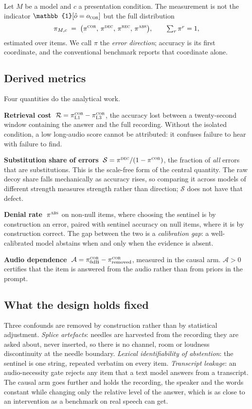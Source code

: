 \documentclass{article}
\begin{document}
Let $M$ be a model and $c$ a presentation condition. The measurement is not
the indicator $\mathbb{1}[\hat{o}=o_{\textsc{cor}}]$ but the full
distribution
\[
  \pi_{M,c} \;=\; \big(\pi^{\textsc{cor}},\,\pi^{\textsc{dec}},\,
  \pi^{\textsc{rec}},\,\pi^{\textsc{abs}}\big),
  \qquad \textstyle\sum_r \pi^r = 1 ,
\]
estimated over items. We call $\pi$ the \emph{error direction}; accuracy is
its first coordinate, and the conventional benchmark reports that coordinate
alone.

\subsection{Derived metrics}
Four quantities do the analytical work.

\noindent\textbf{Retrieval cost} $\;\mathcal{R} =
\pi^{\textsc{cor}}_{\textsc{L1}} - \pi^{\textsc{cor}}_{\textsc{L3}}$, the
accuracy lost between a twenty-second window containing the answer and the
full recording. Without the isolated condition, a low long-audio score cannot
be attributed: it confuses failure to hear with failure to find.

\noindent\textbf{Substitution share of errors} $\;\mathcal{S} =
\pi^{\textsc{dec}}/(1-\pi^{\textsc{cor}})$, the fraction of \emph{all} errors
that are substitutions. This is the scale-free form of the central quantity.
The raw decoy share falls mechanically as accuracy rises, so comparing it
across models of different strength measures strength rather than direction;
$\mathcal{S}$ does not have that defect.

\noindent\textbf{Denial rate} $\;\pi^{\textsc{abs}}$ on non-null items, where
choosing the sentinel is by construction an error, paired with sentinel
accuracy on null items, where it is by construction correct. The gap between
the two is a \emph{calibration gap}: a well-calibrated model abstains when
and only when the evidence is absent.

\noindent\textbf{Audio dependence} $\;\mathcal{A} =
\pi^{\textsc{cor}}_{0\text{dB}} - \pi^{\textsc{cor}}_{\text{removed}}$,
measured in the causal arm. $\mathcal{A}>0$ certifies that the item is
answered from the audio rather than from priors in the prompt.

\subsection{What the design holds fixed}
Three confounds are removed by construction rather than by statistical
adjustment. \emph{Splice artefacts}: needles are harvested from the recording
they are asked about, never inserted, so there is no channel, room or
loudness discontinuity at the needle boundary. \emph{Lexical identifiability
of abstention}: the sentinel is one string, repeated verbatim on every item.
\emph{Transcript leakage}: an audio-necessity gate rejects any item that a
text model answers from a transcript. The causal arm goes further and holds
the recording, the speaker and the words constant while changing only the
relative level of the answer, which is as close to an intervention as a
benchmark on real speech can get.
\end{document}
